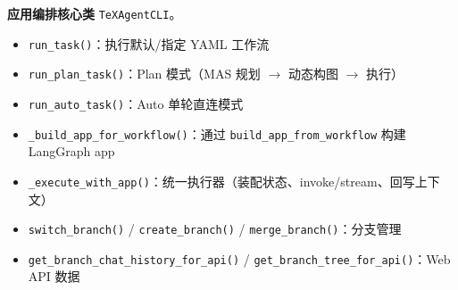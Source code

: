 \begin{description}[leftmargin=4em,style=nextline]
    \item[\texttt{agent\_cli.py}]
    \textbf{应用编排核心类} \texttt{TeXAgentCLI}。
    \begin{itemize}
        \item \texttt{run\_task()}：执行默认/指定 YAML 工作流
        \item \texttt{run\_plan\_task()}：Plan 模式（MAS 规划 $\rightarrow$ 动态构图 $\rightarrow$ 执行）
        \item \texttt{run\_auto\_task()}：Auto 单轮直连模式
        \item \texttt{\_build\_app\_for\_workflow()}：通过 \texttt{build\_app\_from\_workflow} 构建 LangGraph app
        \item \texttt{\_execute\_with\_app()}：统一执行器（装配状态、invoke/stream、回写上下文）
        \item \texttt{switch\_branch()} / \texttt{create\_branch()} / \texttt{merge\_branch()}：分支管理
        \item \texttt{get\_branch\_chat\_history\_for\_api()} / \texttt{get\_branch\_tree\_for\_api()}：Web API 数据
    \end{itemize}
\end{description}
